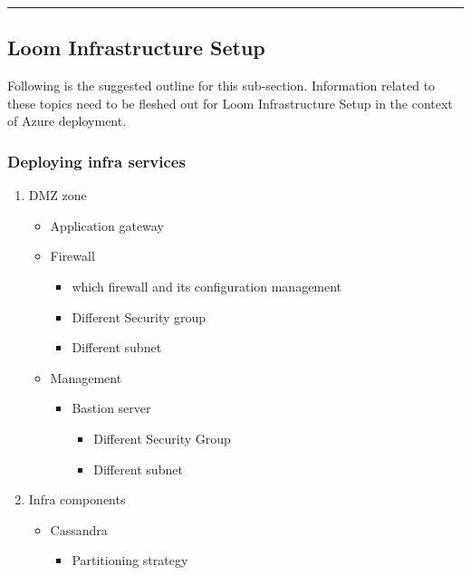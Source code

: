 \documentclass[letterpaper,10pt,english]{sphinxmanual}
\begin{document}
\bigskip\hrule\bigskip



\subsection{Loom Infrastructure Setup}
\label{\detokenize{loom_installation_guide:loom-infrastructure-setup}}
Following is the suggested outline for this sub-section.  Information related to these topics need to be fleshed out for Loom Infrastructure Setup in the context of Azure deployment.


\subsubsection{Deploying infra services}
\label{\detokenize{loom_installation_guide:deploying-infra-services}}\begin{enumerate}
\item {} 
DMZ zone
\begin{itemize}
\item {} 
Application gateway

\item {} 
Firewall
\begin{itemize}
\item {} 
which firewall and its configuration management

\item {} 
Different Security group

\item {} 
Different subnet

\end{itemize}

\item {} 
Management
\begin{itemize}
\item {} 
Bastion server
\begin{itemize}
\item {} 
Different Security Group

\item {} 
Different subnet

\end{itemize}

\end{itemize}

\end{itemize}

\item {} 
Infra components
\begin{itemize}
\item {} 
Cassandra
\begin{itemize}
\item {} 
Partitioning strategy


\end{itemize}
\end{itemize}
\end{enumerate}
\end{document}
